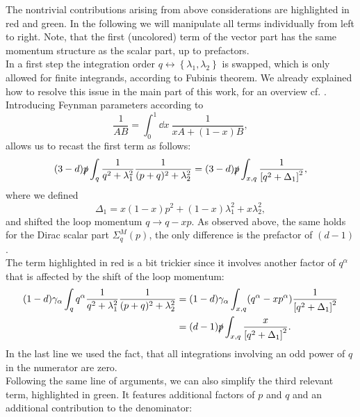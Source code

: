 The nontrivial contributions arising from above considerations are highlighted in red and green. In the following we will manipulate all terms individually from left to right. Note, that the first (uncolored) term of the vector part has the same momentum structure as the scalar part, up to prefactors. \\
In a first step the integration order $q\leftrightarrow\left\{\lambda_1,\lambda_2\right\}$ is swapped, which is only allowed for finite integrands, according to Fubinis theorem. We already explained how to resolve this issue in the main part of this work, for an overview cf. . \\ Introducing Feynman parameters according to 
\begin{equation}
\frac{1}{A B}=\int_{0}^{1} \dd x\ \frac{1}{x A+(1-x) B},
\end{equation}
allows us to recast the first term as follows:
\begin{equation}
	(3-d)\slashed{p} \int_q \frac{1}{q^2 + \lambda_1^2}\frac{1}{(p+q)^2 + \lambda_2^2} = (3-d)\slashed{p}\int_{x,q} \frac{1}{\left[q^2 + \Delta_1\right]^2},
\end{equation}
where we defined
\begin{equation}
	\Delta_1 = x(1-x)p^2 + (1-x)\lambda_1^2 + x\lambda_2^2,
\end{equation}
and shifted the loop momentum $q \rightarrow q-xp$. As observed above, the same holds for the Dirac scalar part $\Sigma_{q}^M(p)$, the only difference is the prefactor of $(d-1)$. \\
 The term highlighted in red is a bit trickier since it involves another factor of $q^{\alpha}$ that is affected by the shift of the loop momentum: 
\begin{equation}
\begin{aligned}
	(1-d)\gamma_{\alpha} \int_q q^{\alpha} \frac{1}{q^2 + \lambda_1^2}\frac{1}{(p+q)^2 + \lambda_2^2} &= (1-d)\gamma_{\alpha}\int_{x,q} (q^{\alpha} - xp^{\alpha})\frac{1}{\left[q^2 + \Delta_1\right]^2}\\
	&= (d-1)\slashed{p}\int_{x,q}\frac{x}{\left[q^2 + \Delta_1\right]^2}.
	\end{aligned}
\end{equation}
In the last line we used the fact, that all integrations involving an odd power of $q$ in the numerator are zero.\\
 Following the same line of arguments, we can also simplify the third relevant term, highlighted in green. It features additional factors of $p$ and $q$ and an additional contribution to the denominator:
